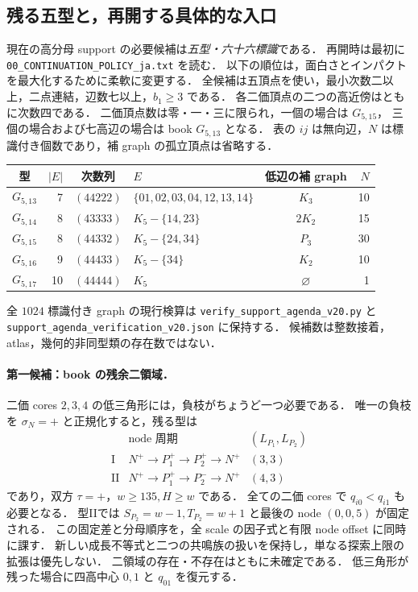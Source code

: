 \subsection{残る五型と，再開する具体的な入口}
\label{ns20:support-agenda}

現在の高分母 support の必要候補は\emph{五型・六十六標識}である．
再開時は最初に \nolinkurl{00_CONTINUATION_POLICY_ja.txt} を読む．
以下の順位は，面白さとインパクトを最大化するために柔軟に変更する．
全候補は五頂点を使い，最小次数二以上，二点連結，辺数七以上，$b_1\ge3$ である．
各二価頂点の二つの高近傍はともに次数四である．
二価頂点数は零・一・三に限られ，一個の場合は $G_{5,15}$，
三個の場合および七高辺の場合は book $G_{5,13}$ となる．
表の $ij$ は無向辺，$N$ は標識付き個数であり，補 graph の孤立頂点は省略する．
\begin{center}
\footnotesize
\setlength{\tabcolsep}{4pt}
\begin{tabular}{crclcr}
型&$|E|$&次数列&$E$&低辺の補 graph&$N$\\\hline
$G_{5,13}$&7&$(44222)$&$\{01,02,03,04,12,13,14\}$&$K_3$&10\\
$G_{5,14}$&8&$(43333)$&$K_5-\{14,23\}$&$2K_2$&15\\
$G_{5,15}$&8&$(44332)$&$K_5-\{24,34\}$&$P_3$&30\\
$G_{5,16}$&9&$(44433)$&$K_5-\{34\}$&$K_2$&10\\
$G_{5,17}$&10&$(44444)$&$K_5$&$\varnothing$&1
\end{tabular}
\end{center}
全 $1024$ 標識付き graph の現行検算は
\nolinkurl{verify_support_agenda_v20.py} と
\nolinkurl{support_agenda_verification_v20.json} に保持する．
候補数は整数接着，atlas，幾何的非同型類の存在数ではない．

\paragraph{第一候補：book の残余二領域．}
二価 cores $2,3,4$ の低三角形には，負枝がちょうど一つ必要である．
唯一の負枝を $\sigma_N=+$ と正規化すると，残る型は
\[
\begin{array}{c|c|c}
 & \text{node 周期} & (L_{P_1},L_{P_2})\\ \hline
\mathrm I&N^+\to P_1^+\to P_2^+\to N^+&(3,3)\\
\mathrm {II}&N^+\to P_1^+\to P_2^-\to N^+&(4,3)
\end{array}
\]
であり，双方 $\tau=+$，$w\ge135,H\ge w$ である．
全ての二価 cores で $q_{i0}<q_{i1}$ も必要となる．
型IIでは $S_{P_2}=w-1,T_{P_2}=w+1$ と最後の node $(0,0,5)$ が固定される．
この固定差と分母順序を，全 scale の因子式と有限 node offset に同時に課す．
新しい成長不等式と二つの共鳴族の扱いを保持し，単なる探索上限の拡張は優先しない．
二領域の存在・不存在はともに未確定である．
低三角形が残った場合に四高中心 $0,1$ と $q_{01}$ を復元する．

